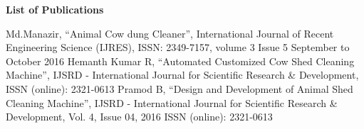 \begin{center}
\begin{huge}
\bfseries{List of Publications}
\end{huge}
\end{center}
 Md.Manazir, “Animal Cow dung Cleaner”, International Journal of Recent Engineering Science (IJRES), ISSN: 2349-7157, volume 3 Issue 5 September to October 2016
 Hemanth Kumar R, “Automated Customized Cow Shed Cleaning Machine”, IJSRD - International Journal for Scientific Research & Development, ISSN (online): 2321-0613
 Pramod B, “Design and Development of Animal Shed Cleaning Machine”, IJSRD - International Journal for Scientific Research & Development, Vol. 4, Issue 04, 2016 ISSN (online): 2321-0613

\pagebreak
